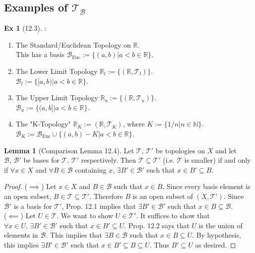 \documentclass{article}
\newcommand{\R}{\ensuremath{\mathbb{R}}}
\newcommand{\N}{\ensuremath{\mathbb{N}}}
\newcommand{\B}{\ensuremath{\mathcal{B}}}
\newcommand{\Iff}{if and only if}
\newcommand{\tp}{\ensuremath{\mathcal{T}}}
\newcommand{\Ts}[2]{\ensuremath{(#1,#2)}}
\newcommand{\Beuc}{\ensuremath{\B_\text{Euc}}}
\newcommand{\union}{\cup}
\renewcommand{\Subset}{\subseteq}
\theoremstyle{definition}
\newtheorem*{ex}{Ex}
\newtheorem*{lem}{Lemma}
\theoremstyle{remark}
\begin{document}
    \subsection*{Examples of $\tp_\B$}
        \begin{ex}[12.3]:
            \begin{enumerate}
                \item The Standard/Euclidean Topology on $\R$.\\
                    This has a basis $\Beuc := \{(a,b)| a<b \in \R\}$.
                
                \item The Lower Limit Topology $\R_l := \{(\R,\tp_l)\}$.\\
                    $\B_l := \{[a,b)| a<b \in \R\}$.
                
                \item The Upper Limit Topology $\R_u := \{(\R,\tp_u)\}$.\\
                    $\B_u := \{(a,b]| a<b \in \R\}$.
                    
                \item The "K-Topology" $\R_K := (\R,\tp_K)$, where $K:= \{1/n|n \in \N\}$.\\
                    $\B_K := \Beuc \union \{(a,b) - K|a<b\in \R\}$.
            \end{enumerate}
        \end{ex}
        
        \begin{lem}[Comparison Lemma 12.4]
            Let $\tp, \, \tp'$ be topologies on $X$ and let $\B, \, \B'$ be bases for $\tp, \, \tp'$ respectively. Then $\tp \Subset \tp'$ (i.e. $\tp$ is smaller) \Iff{} $\forall x \in X$ and $\forall B \in \B$ containing $x$, $\exists B' \in \B'$ such that $x \in B' \Subset B$.
        \end{lem}
        
        \begin{proof}
            ($\implies$) Let $x \in X$ and $B \in \B$ such that $x \in B$. Since every basis element is an open subset, $B \in \tp \Subset \tp'$. Therefore $B$ is an open subset of $\Ts{X}{\tp'}$. Since $\B'$ is a basis for $\tp'$, Prop. 12.1 implies that $\exists B' \in \B'$ such that $x \in B \Subset \B$.\\
            ($\impliedby$) Let $U \in \tp$. We want to show $U \in \tp'$. It suffices to show that $\forall x \in U, \, \exists B' \in \B'$ such that $x \in B' \Subset U$. Prop. 12.2 says that $U$ is the union of elements in $\B$. This implies that $\exists B \in \B$ such that $x \in B \Subset U$. By hypothesis, this implies $\exists B' \in \B'$ such that $x \in B' \Subset B \Subset U$. Thus $B' \Subset U$ as desired.
        \end{proof}
        
\end{document}
